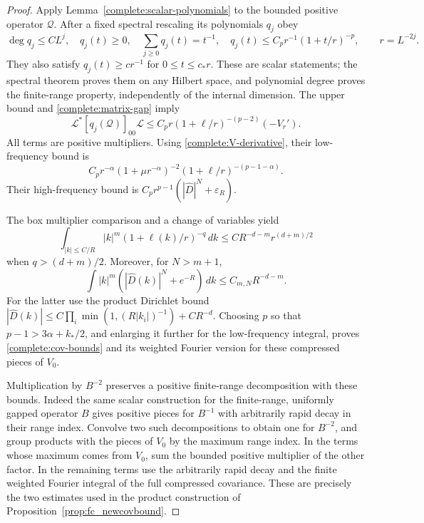 \documentclass[11pt]{article}
\begin{document}
\begin{proof}
Apply Lemma~\ref{complete:scalar-polynomials} to the bounded positive
operator \(\mathcal Q\).
After a fixed spectral rescaling its polynomials \(q_j\) obey
\[
 \deg q_j\le CL^j,\quad q_j(t)\ge0,\quad
 \sum_{j\ge0}q_j(t)=t^{-1},\quad
 q_j(t)\le C_p r^{-1}(1+t/r)^{-p},\qquad r=L^{-2j}.
\]
They also satisfy \(q_j(t)\ge c r^{-1}\) for \(0\le t\le c_*r\).
These are scalar statements; the spectral theorem proves them on
any Hilbert space, and polynomial degree proves the finite-range
property, independently of the internal dimension. The upper bound
and \eqref{complete:matrix-gap} imply
\[
 \mathcal L^*[q_j(\mathcal Q)]_{00}\mathcal L
 \le C_p r(1+\ell/r)^{-(p-2)}(-V_r').
\]
All terms are positive multipliers. Using
\eqref{complete:V-derivative}, their low-frequency bound is
\begin{equation}\label{complete:slice-fourier}
 C_p r^{-\alpha}(1+\mu r^{-\alpha})^{-2}
              (1+\ell/r)^{-(p-1-\alpha)}.
\end{equation}
Their high-frequency bound is
\(C_pr^{p-1}(|\widehat D|^N+\varepsilon_R)\).

The box multiplier comparison and a change of variables yield
\[
 \int_{|k|\le C/R}|k|^m(1+\ell(k)/r)^{-q}\,dk
   \le C R^{-d-m}r^{(d+m)/2}
\]
when \(q>(d+m)/2\). Moreover, for \(N>m+1\),
\[
 \int |k|^m(|\widehat D(k)|^N+e^{-R})\,dk
       \le C_{m,N}R^{-d-m}.
\]
For the latter use the product Dirichlet bound
\(|\widehat D(k)|\le C\prod_i\min(1,(R|k_i|)^{-1})+CR^{-d}\).
Choosing \(p\) so that \(p-1>3\alpha+k_*/2\), and enlarging it further for the low-frequency integral, proves
\eqref{complete:cov-bounds} and its weighted Fourier version for
these compressed pieces of \(V_0\).

Multiplication by \(B^{-2}\) preserves a positive finite-range
decomposition with these bounds. Indeed the same scalar construction
for the finite-range, uniformly gapped operator \(B\) gives positive
pieces for \(B^{-1}\) with arbitrarily rapid decay in their range
index. Convolve two such decompositions to obtain one for \(B^{-2}\),
and group products with the pieces of \(V_0\) by the maximum range
index. In the terms whose maximum comes from \(V_0\), sum the bounded
positive multiplier of the other factor. In the remaining terms use
the arbitrarily rapid decay and the finite weighted Fourier integral
of the full compressed covariance. These are precisely the two
estimates used in the product construction of
Proposition~\ref{prop:fc_newcovbound}.


\end{proof}
\end{document}
